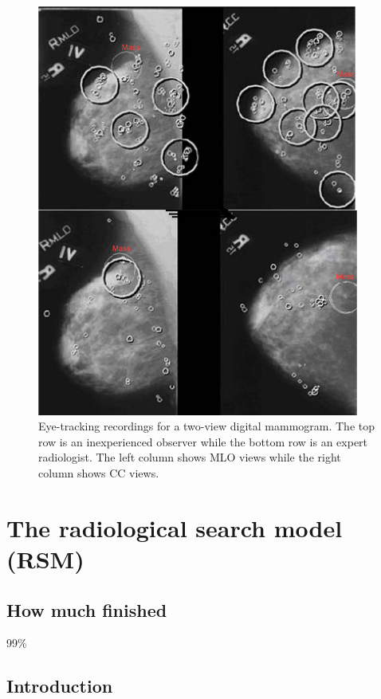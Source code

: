 \documentclass[
]{book}
\begin{document}
\begin{figure}

{\centering \includegraphics[width=300pt]{images/15-visual-search/eye-tracking-4-images} 

}

\caption{Eye-tracking recordings for a two-view digital mammogram. The top row is an inexperienced observer while the bottom row is an expert radiologist. The left column shows MLO views while the right column shows CC views.}\label{fig:visual-search-eye-tracking}
\end{figure}

\hypertarget{rsm}{%
\chapter{The radiological search model (RSM)}\label{rsm}}

\hypertarget{rsm-how-much-finished}{%
\section{How much finished}\label{rsm-how-much-finished}}

99\%

\hypertarget{rsm-intro}{%
\section{Introduction}\label{rsm-intro}}
\end{document}
